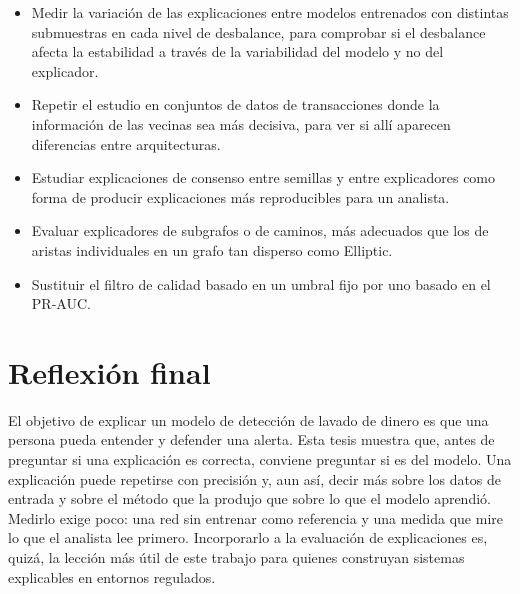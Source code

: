 \begin{itemize}
  \item Medir la variación de las explicaciones entre modelos entrenados con distintas
        submuestras en cada nivel de desbalance, para comprobar si el desbalance afecta la
        estabilidad a través de la variabilidad del modelo y no del explicador.
  \item Repetir el estudio en conjuntos de datos de transacciones donde la información de las
        vecinas sea más decisiva, para ver si allí aparecen diferencias entre arquitecturas.
  \item Estudiar explicaciones de consenso entre semillas y entre explicadores como forma de
        producir explicaciones más reproducibles para un analista.
  \item Evaluar explicadores de subgrafos o de caminos, más adecuados que los de aristas
        individuales en un grafo tan disperso como Elliptic.
  \item Sustituir el filtro de calidad basado en un umbral fijo por uno basado en el PR-AUC.
\end{itemize}

\section{Reflexión final}

El objetivo de explicar un modelo de detección de lavado de dinero es que una persona pueda
entender y defender una alerta. Esta tesis muestra que, antes de preguntar si una explicación es
correcta, conviene preguntar si es del modelo. Una explicación puede repetirse con precisión y,
aun así, decir más sobre los datos de entrada y sobre el método que la produjo que sobre lo que
el modelo aprendió. Medirlo exige poco: una red sin entrenar como referencia y una medida que
mire lo que el analista lee primero. Incorporarlo a la evaluación de explicaciones es, quizá, la
lección más útil de este trabajo para quienes construyan sistemas explicables en entornos
regulados.
